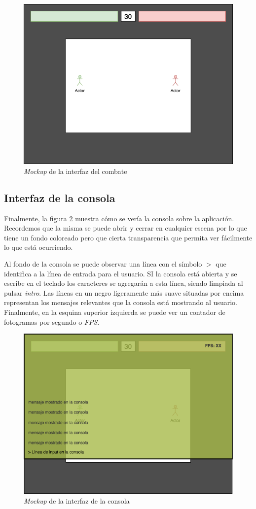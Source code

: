 \begin{figure}
	\centerline{\includegraphics[width=12cm]{otros/graphicalInterface/gameplay.png}}
	\caption{\textit{Mockup} de la interfaz del combate}
	\label{inter:combat}
\end{figure}

\subsection{Interfaz de la consola}

Finalmente, la figura \ref{inter:console} muestra cómo se vería la consola sobre la aplicación. Recordemos que la misma se puede abrir y cerrar en cualquier escena por lo que tiene un fondo coloreado pero que cierta transparencia que permita ver fácilmente lo que está ocurriendo.

\bigskip

Al fondo de la consola se puede observar una línea con el símbolo $>$ que identifica a la línea de entrada para el usuario. SI la consola está abierta y se escribe en el teclado los caracteres se agregarán a esta línea, siendo limpiada al pulsar \textit{intro}. Las líneas en un negro ligeramente más suave situadas por encima representan los mensajes relevantes que la consola está mostrando al usuario. Finalmente, en la esquina superior izquierda se puede ver un contador de fotogramas por segundo o \textit{FPS}.

\begin{figure}
	\centerline{\includegraphics[width=12cm]{otros/graphicalInterface/console.png}}
	\caption{\textit{Mockup} de la interfaz de la consola}
	\label{inter:console}
\end{figure}


